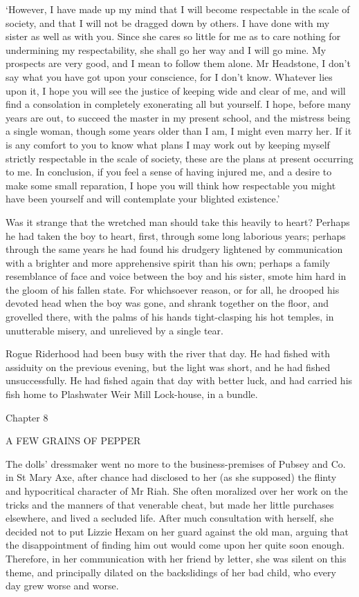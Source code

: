 ‘However, I have made up my mind that I will become respectable in the
scale of society, and that I will not be dragged down by others. I have
done with my sister as well as with you. Since she cares so little for
me as to care nothing for undermining my respectability, she shall go
her way and I will go mine. My prospects are very good, and I mean to
follow them alone. Mr Headstone, I don’t say what you have got upon your
conscience, for I don’t know. Whatever lies upon it, I hope you will see
the justice of keeping wide and clear of me, and will find a consolation
in completely exonerating all but yourself. I hope, before many years
are out, to succeed the master in my present school, and the mistress
being a single woman, though some years older than I am, I might even
marry her. If it is any comfort to you to know what plans I may work out
by keeping myself strictly respectable in the scale of society, these
are the plans at present occurring to me. In conclusion, if you feel a
sense of having injured me, and a desire to make some small reparation,
I hope you will think how respectable you might have been yourself and
will contemplate your blighted existence.’

Was it strange that the wretched man should take this heavily to
heart? Perhaps he had taken the boy to heart, first, through some
long laborious years; perhaps through the same years he had found
his drudgery lightened by communication with a brighter and more
apprehensive spirit than his own; perhaps a family resemblance of face
and voice between the boy and his sister, smote him hard in the gloom
of his fallen state. For whichsoever reason, or for all, he drooped his
devoted head when the boy was gone, and shrank together on the floor,
and grovelled there, with the palms of his hands tight-clasping his hot
temples, in unutterable misery, and unrelieved by a single tear.


Rogue Riderhood had been busy with the river that day. He had fished
with assiduity on the previous evening, but the light was short, and
he had fished unsuccessfully. He had fished again that day with better
luck, and had carried his fish home to Plashwater Weir Mill Lock-house,
in a bundle.



Chapter 8

A FEW GRAINS OF PEPPER


The dolls’ dressmaker went no more to the business-premises of Pubsey
and Co. in St Mary Axe, after chance had disclosed to her (as she
supposed) the flinty and hypocritical character of Mr Riah. She often
moralized over her work on the tricks and the manners of that venerable
cheat, but made her little purchases elsewhere, and lived a secluded
life. After much consultation with herself, she decided not to put
Lizzie Hexam on her guard against the old man, arguing that the
disappointment of finding him out would come upon her quite soon enough.
Therefore, in her communication with her friend by letter, she was
silent on this theme, and principally dilated on the backslidings of her
bad child, who every day grew worse and worse.

